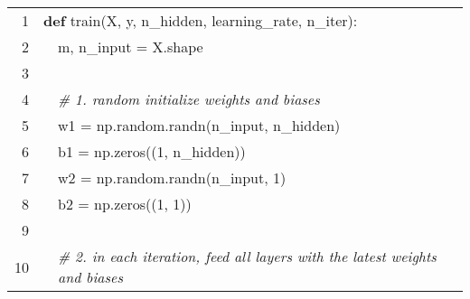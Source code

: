 \documentclass[preprint,12pt]{elsarticle}
\begin{document}
\begin{table}[ht]
    \centering
    {\ttfamily\scriptsize
        \begin{tabular}{|r l l l l|}
            \hline
            \rowcolor{regularback} \cellcolor{linenumberback} \textcolor{grayhighlight}{1} & \multicolumn{4}{l|}{\textcolor{codegreen}{\textbf{def}} \textcolor{navykeyword}{train}(X, y, n\_hidden, learning\_rate, n\_iter):} \\
            \rowcolor{regularback} \cellcolor{linenumberback} \textcolor{grayhighlight}{2} & & \multicolumn{3}{l|}{m, n\_input \textcolor{grayhighlight}{=} X\textcolor{grayhighlight}{.}shape} \\
            \rowcolor{regularback} \cellcolor{linenumberback} \textcolor{grayhighlight}{3} & \multicolumn{4}{l|}{} \\
            \rowcolor{regularback} \cellcolor{linenumberback} \textcolor{grayhighlight}{4} & & \multicolumn{3}{l|}{\textcolor{commentblue}{\textit{\# 1. random initialize weights and biases}}} \\
            \rowcolor{regularback} \cellcolor{linenumberback} \textcolor{grayhighlight}{5} & & \multicolumn{3}{l|}{w1 \textcolor{grayhighlight}{=} np\textcolor{grayhighlight}{.}random\textcolor{grayhighlight}{.}randn(n\_input, n\_hidden)} \\
            \rowcolor{regularback} \cellcolor{linenumberback} \textcolor{grayhighlight}{6} & & \multicolumn{3}{l|}{b1 \textcolor{grayhighlight}{=} np\textcolor{grayhighlight}{.}zeros((\textcolor{grayhighlight}{1}, n\_hidden))} \\
            \rowcolor{regularback} \cellcolor{linenumberback} \textcolor{grayhighlight}{7} & & \multicolumn{3}{l|}{w2 \textcolor{grayhighlight}{=} np\textcolor{grayhighlight}{.}random\textcolor{grayhighlight}{.}randn(n\_input, \textcolor{grayhighlight}{1})} \\
            \rowcolor{regularback} \cellcolor{linenumberback} \textcolor{grayhighlight}{8} & & \multicolumn{3}{l|}{b2 \textcolor{grayhighlight}{=} np\textcolor{grayhighlight}{.}zeros((\textcolor{grayhighlight}{1}, \textcolor{grayhighlight}{1}))} \\
            \rowcolor{regularback} \cellcolor{linenumberback} \textcolor{grayhighlight}{9} & \multicolumn{4}{l|}{} \\
            \rowcolor{regularback} \cellcolor{linenumberback} \textcolor{grayhighlight}{10} & & \multicolumn{3}{l|}{\textcolor{commentblue}{\textit{\# 2. in each iteration, feed all layers with the latest weights and biases}}} \\

\end{tabular}}
\end{table}
\end{document}
